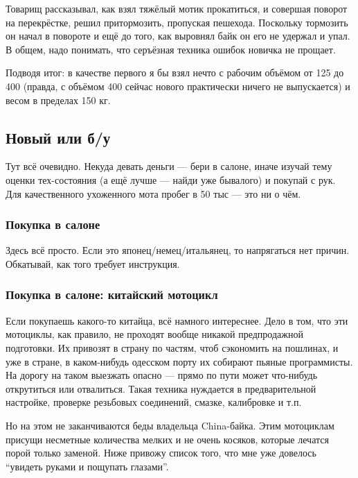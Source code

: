 \documentclass[12pt,a4paper]{article}
\begin{document}
Товарищ рассказывал, как взял тяжёлый мотик прокатиться, и совершая
поворот на перекрёстке, решил притормозить, пропуская пешехода.
Поскольку тормозить он начал в повороте и ещё до того, как выровнял
байк он его не удержал и упал. В общем, надо понимать, что серъёзная
техника ошибок новичка не прощает.

Подводя итог: в качестве первого я бы взял нечто с рабочим объёмом от
125 до 400 (правда, с объёмом 400 сейчас нового практически ничего не
выпускается) и весом в пределах 150 кг.

\subsection{Новый или б/у}

Тут всё очевидно. Некуда девать деньги --- бери в салоне, иначе изучай
тему оценки тех-состояния (а ещё лучше --- найди уже бывалого) и покупай
с рук. Для качественного ухоженного мота пробег в 50 тыс --- это ни о чём.

\subsubsection{Покупка в салоне}

Здесь всё просто. Если это японец/немец/итальянец, то напрягаться
нет причин. Обкатывай, как того требует инструкция.

\subsubsection{Покупка в салоне: китайский мотоцикл}

Если покупаешь какого-то китайца, всё намного интереснее. Дело в
том, что эти мотоциклы, как правило, не проходят вообще никакой
предпродажной подготовки. Их привозят в страну по частям, чтоб
сэкономить на пошлинах, и уже в стране, в каком-нибудь одесском
порту их собирают пьяные программисты. На дорогу на таком выезжать
опасно --- прямо по пути может что-нибудь открутиться или отвалиться.
Такая техника нуждается в предварительной настройке, проверке резьбовых
соединений, смазке, калибровке и т.п.

Но на этом не заканчиваются беды владельца China-байка. Этим
мотоциклам присущи несметные количества мелких и не очень косяков,
которые лечатся порой только заменой. Ниже привожу список того,
что мне уже довелось ``увидеть руками и пощупать глазами''.
\end{document}
